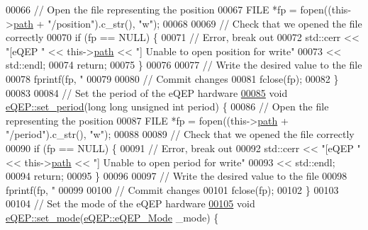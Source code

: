 \begin{DoxyCode}
00066   \textcolor{comment}{// Open the file representing the position}
00067   FILE *fp = fopen((this->\hyperlink{class_hardware_1_1e_q_e_p_a82718bc8478cde37f28fc685a859525e}{path} + \textcolor{stringliteral}{"/position"}).c\_str(), \textcolor{stringliteral}{"w"});
00068 
00069   \textcolor{comment}{// Check that we opened the file correctly}
00070   \textcolor{keywordflow}{if} (fp == NULL) \{
00071     \textcolor{comment}{// Error, break out}
00072     std::cerr << \textcolor{stringliteral}{"[eQEP "} << this->\hyperlink{class_hardware_1_1e_q_e_p_a82718bc8478cde37f28fc685a859525e}{path} << \textcolor{stringliteral}{"] Unable to open position for write"}
00073               << std::endl;
00074     \textcolor{keywordflow}{return};
00075   \}
00076 
00077   \textcolor{comment}{// Write the desired value to the file}
00078   fprintf(fp, \textcolor{stringliteral}{"%
00079 
00080   \textcolor{comment}{// Commit changes}
00081   fclose(fp);
00082 \}
00083 
00084 \textcolor{comment}{// Set the period of the eQEP hardware}
\hypertarget{eqep_8cpp_source_l00085}{}\hyperlink{class_hardware_1_1e_q_e_p_ab8b1babd8dc96f5052be96ed6e65e111}{00085} \textcolor{keywordtype}{void} \hyperlink{class_hardware_1_1e_q_e_p_ab8b1babd8dc96f5052be96ed6e65e111}{eQEP::set\_period}(\textcolor{keywordtype}{long} \textcolor{keywordtype}{long} \textcolor{keywordtype}{unsigned} \textcolor{keywordtype}{int} period) \{
00086   \textcolor{comment}{// Open the file representing the position}
00087   FILE *fp = fopen((this->\hyperlink{class_hardware_1_1e_q_e_p_a82718bc8478cde37f28fc685a859525e}{path} + \textcolor{stringliteral}{"/period"}).c\_str(), \textcolor{stringliteral}{"w"});
00088 
00089   \textcolor{comment}{// Check that we opened the file correctly}
00090   \textcolor{keywordflow}{if} (fp == NULL) \{
00091     \textcolor{comment}{// Error, break out}
00092     std::cerr << \textcolor{stringliteral}{"[eQEP "} << this->\hyperlink{class_hardware_1_1e_q_e_p_a82718bc8478cde37f28fc685a859525e}{path} << \textcolor{stringliteral}{"] Unable to open period for write"}
00093               << std::endl;
00094     \textcolor{keywordflow}{return};
00095   \}
00096 
00097   \textcolor{comment}{// Write the desired value to the file}
00098   fprintf(fp, \textcolor{stringliteral}{"%
00099 
00100   \textcolor{comment}{// Commit changes}
00101   fclose(fp);
00102 \}
00103 
00104 \textcolor{comment}{// Set the mode of the eQEP hardware}
\hypertarget{eqep_8cpp_source_l00105}{}\hyperlink{class_hardware_1_1e_q_e_p_a137d1fb0b0e5772487ece48254342294}{00105} \textcolor{keywordtype}{void} \hyperlink{class_hardware_1_1e_q_e_p_a137d1fb0b0e5772487ece48254342294}{eQEP::set\_mode}(\hyperlink{class_hardware_1_1e_q_e_p_a3f97f26c64d49d6f2643a257b7249070}{eQEP::eQEP\_Mode} \_mode) \{
}}
\end{DoxyCode}
